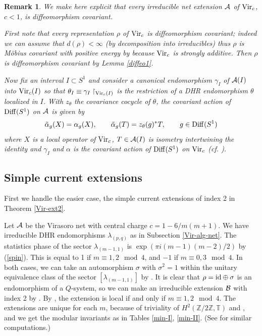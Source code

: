 \documentclass[12pt]{article}
\def\Diff{{\rm Diff}}
\def\id{{\rm id}}
\def\Vir{{\rm Vir}}
\def\a{\alpha}
\def\la{\lambda}
\def\th{\theta}
\newtheorem{remark}[theorem]{Remark}
\def\A{{\cal A}}
\def\N{{\cal A}}
\def\M{{\cal B}}
\def\Z{{\mathbb Z}}
\def\T{{\mathbb T}}
\begin{document}
\begin{remark}{\rm We make here explicit that every irreducible net 
extension $\A$ of $\Vir_c$, $c<1$, is diffeomorphism covariant.  

First note that every representation $\rho$ of 
$\Vir_c$ is diffeomorphism covariant; indeed we can assume that 
$d(\rho)<\infty$ (by decomposition into irreducibles) thus $\rho$ is 
M\"{o}bius covariant with positive energy by \cite{GL1} because
$\Vir_c$ is strongly additive. Then $\rho$ is diffeomorphism covariant 
by Lemma \ref{diffeo1}. 

Now fix an interval $I\subset S^1$ 
and consider a canonical endomorphism $\gamma_I$ of $\A(I)$ into 
$\Vir_c(I)$ so that $\th_I\equiv \gamma_I 
\upharpoonright_{\Vir_c(I)}$ is the restriction of a DHR endomorphism $\th$
localized in $I$. With $z_{\th}$ the covariance cocycle of 
$\th$, the covariant action of $\Diff(S^1)$ on $\A$ is given by 
\[
\tilde\a_g(X)=\a_g(X),\qquad \tilde\a_g(T)=z_{\th}(g)^*T, \qquad g\in\Diff(S^1)
\]
where $X$ is a local operator of $\Vir_c$, $T\in\A(I)$ is isometry 
intertwining the identity and $\gamma_I$ and $\a$ is the covariant 
action of $\Diff(S^1)$ on $\Vir_c$ (cf. \cite{L4}).
}\end{remark}

\subsection{Simple current extensions}

First we handle the easier case, the simple current extensions of index 2
in Theorem \ref{Vir-ext2}.

Let $\N$ be the Virasoro net
with central charge $c=1-6/m(m+1)$.  We have irreducible DHR
endomorphisms $\la_{(p,q)}$ as in Subsection \ref{Vir-alg-net}.
The statistics phase of the sector $\la_{(m-1,1)}$ is
$\exp (\pi i(m-1)(m-2)/2)$ by (\ref{spin}).  This is
equal to 1 if $m\equiv 1,2 \mod 4$, and $-1$
if $m\equiv 0,3\mod 4$.  In both cases, we can take an automorphism
$\sigma$ with $\sigma^2=1$ within the unitary equivalence class 
of the sector $[\la_{(m-1,1)}]$ by \cite[Lemma 4.4]{R2}.
It is clear that $\rho=\id\oplus\sigma$ is an endomorphism
of a $Q$-system, so we can make an irreducible extension $\M$ with 
index 2 by \cite[Theorem 4.9]{LR}.  By \cite[II, Corollary 3.7]{BE}, 
the extension is local if and only if $m\equiv 1,2 \mod 4$.
The extensions are unique for each $m$, because of
triviality of $H^2(\Z/2\Z, \T)$ and \cite{IK}, and we get the modular 
invariants as in Tables \ref{min-I}, \ref{min-II}.
(See \cite[II, Section 3]{BE} for similar computations.)
\end{document}
